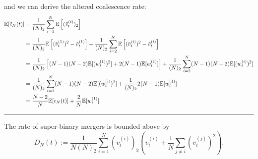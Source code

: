 \documentclass{article}
\newcommand{\E}{\mathbb{E}}
\newcommand{\vt}[2][t]{v_{#1}^{(#2)}}
\newcommand{\vttilde}[2][t]{\tilde{v}_{#1}^{(#2)}}
\newcommand{\wt}[2][t]{w_{#1}^{(#2)}}
\begin{document}
and we can derive the altered coalescence rate:
\begin{align}
\E[\tilde{c}_N(t)] &= \frac{1}{(N)_2} \sum_{i=1}^{N} \E\left[ (\vttilde{i})_2 \right] \notag\\
&= \frac{1}{(N)_2} \E\left[ (\vttilde{1})^2 - \vttilde{1} \right] + \frac{1}{(N)_2}\sum_{i=2}^{N} \E\left[ (\vttilde{i})^2 - \vttilde{i} \right] \notag\\
&= \frac{1}{(N)_2}\left[ (N-1)(N-2)\E[(\wt{1})^2] + 2(N-1)\E[\wt{1}] \right] + \frac{1}{(N)_2} \sum_{i=2}^{N} (N-1)(N-2)\E[(\wt{i})^2] \notag\\
&= \frac{1}{(N)_2} \sum_{i=1}^{N} (N-1)(N-2)\E[(\wt{i})^2] + \frac{1}{(N)_2} 2(N-1)\E[\wt{1}] \notag\\
&= \frac{N-2}{N} \E[c_N(t)] + \frac{2}{N} \E[\wt{1}]
\end{align}

\rule{\textwidth}{1pt}

The rate of super-binary mergers is bounded above by
\begin{equation}
D_N(t) := \frac{1}{N(N)_2} \sum_{i=1}^N (\vt{i})_2 \left( \vt{i} + \frac{1}{N} \sum_{j\neq i} (\vt{j})^2 \right).
\end{equation}
\end{document}
